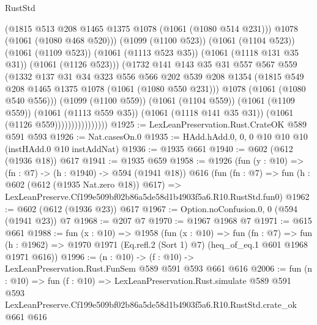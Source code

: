 \begin{lexlean}{RustStd}
\begin{coremodule}
                                  (@1815 @513 @208 @1465 @1375 @1078 (@1061 (@1080 @514 @231)))
                                  @1078
                                  (@1061 (@1080 @468 @520)))
                                (@1099 (@1100 @523))
                                (@1061 (@1104 @523))
                                (@1061 (@1109 @523))
                                (@1061 (@1113 @523 @35))
                                (@1061 (@1118 @131 @35 @31))
                                (@1061 (@1126 @523)))
                              (@1732
                                @141
                                @143
                                @35
                                @31
                                @557
                                @567
                                @559
                                (@1332
                                  @137
                                  @31
                                  @34
                                  @323
                                  @556
                                  @566
                                  @202
                                  @539
                                  @208
                                  @1354
                                  (@1815 @549 @208 @1465 @1375 @1078 (@1061 (@1080 @550 @231)))
                                  @1078
                                  (@1061 (@1080 @540 @556)))
                                (@1099 (@1100 @559))
                                (@1061 (@1104 @559))
                                (@1061 (@1109 @559))
                                (@1061 (@1113 @559 @35))
                                (@1061 (@1118 @141 @35 @31))
                                (@1061 (@1126 @559))))))))))))))))
@1925 := LexLeanPreservation.Rust.CrateOK @589 @591 @593
@1926 := Nat.casesOn.{0}
@1935 := HAdd.hAdd.{0, 0, 0} @10 @10 @10 (instHAdd.{0} @10 instAddNat)
@1936 := @1935 @661
@1940 := @602 (@612 (@1936 @18)) @617
@1941 := @1935 @659
@1958 := @1926
    (fun (y : @10) => (fn : @7) -> (h : @1940) -> @594 (@1941 @18))
    @616
    (fun (fn : @7) =>
    fun (h : @602 (@612 (@1935 Nat.zero @18)) @617) =>
    LexLeanPreserve.Cf199e509bf02b86a5de58d1b4903f5a6.R10.RustStd.fun0)
@1962 := @602 (@612 (@1936 @23)) @617
@1967 := Option.noConfusion.{0, 0} (@594 (@1941 @23)) @7
@1968 := @207 @7
@1970 := @1967 @1968 @7
@1971 := @615 @661
@1988 := fun (x : @10) =>
  @1958
    (fun (x : @10) =>
    fun (fn : @7) =>
    fun (h : @1962) => @1970 @1971 (Eq.refl.{2} (Sort 1) @7) (heq_of_eq.{1} @601 @1968 @1971 @616))
@1996 := (n : @10) -> (f : @10) -> LexLeanPreservation.Rust.FunSem @589 @591 @593 @661 @616
@2006 := fun (n : @10) =>
  fun (f : @10) =>
  LexLeanPreservation.Rust.simulate
    @589
    @591
    @593
    LexLeanPreserve.Cf199e509bf02b86a5de58d1b4903f5a6.R10.RustStd.crate_ok
    @661
    @616
\end{coremodule}
\end{lexlean}
